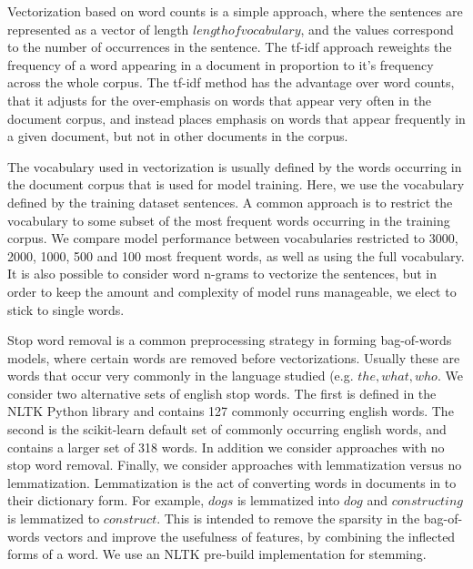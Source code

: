 \documentclass[conference]{IEEEtran}
\begin{document}
Vectorization based on word counts is a simple approach, where the sentences are represented as a vector of length $length of vocabulary$, and the values correspond to the number of occurrences in the sentence. The tf-idf approach reweights the frequency of a word appearing in a document in proportion to it's frequency across the whole corpus. The tf-idf method has the advantage over word counts, that it adjusts for the over-emphasis on words that appear very often in the document corpus, and instead places emphasis on words that appear frequently in a given document, but not in other documents in the corpus.

The vocabulary used in vectorization is usually defined by the words occurring in the document corpus that is used for model training. Here, we use the vocabulary defined by the training dataset sentences. A common approach is to  restrict the vocabulary to some subset of the most frequent words occurring in the training corpus. We compare model performance between vocabularies restricted to 3000, 2000, 1000, 500 and 100 most frequent words, as well as using the full vocabulary. It is also possible to consider word n-grams to vectorize the sentences, but in order to keep the amount and complexity of model runs manageable, we elect to stick to single words.

Stop word removal is a common preprocessing strategy in forming bag-of-words models, where certain words are removed before vectorizations. Usually these are words that occur very commonly in the language studied (e.g. $the, what, who$. We consider two alternative sets of english stop words. The first is defined in the NLTK \cite{nltk} Python library and contains 127 commonly occurring english words. The second is the scikit-learn \cite{scikit-learn} default set of commonly occurring english words, and contains a larger set of 318 words. In addition we consider approaches with no stop word removal. Finally, we consider approaches with lemmatization versus no lemmatization. Lemmatization is the act of converting words in documents in to their dictionary form. For example, $dogs$ is lemmatized into $dog$ and $constructing$ is lemmatized to $construct$. This is intended to remove the sparsity in the bag-of-words vectors and improve the usefulness of features, by combining the inflected forms of a word. We use an NLTK \cite{nltk} pre-build implementation for stemming.
\end{document}
